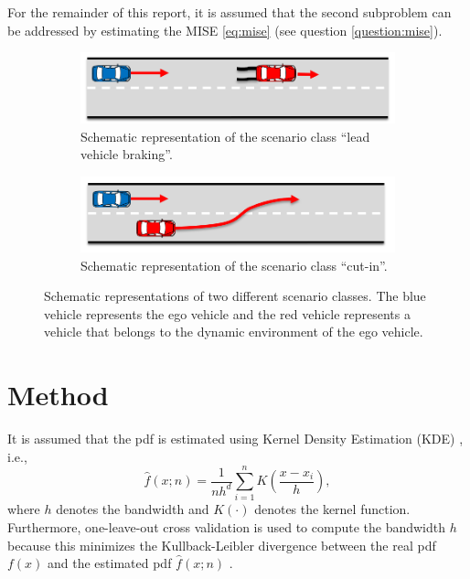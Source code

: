 \documentclass[10pt,final,a4paper,oneside,onecolumn]{article}
\theoremstyle{plain}\newtheorem{definition}{Definition}[section]    %
\theoremstyle{definition}\newtheorem{example}{Example}[section]     %
\theoremstyle{remark}\newtheorem{remarkenv}{Remark}[section]        %
\begin{document}
For the remainder of this report, it is assumed that the second subproblem can be addressed by estimating the MISE \cref{eq:mise} (see question \ref{question:mise}).

\begin{figure}
	\begin{subfigure}{\linewidth}
		\centering
		\includegraphics[scale=0.5]{"Scenario lead braking"}
		\caption{Schematic representation of the scenario class ``lead vehicle braking''.}
		\label{fig:lead vehicle braking}
	\end{subfigure}
	\begin{subfigure}{\linewidth}
		\centering
		\includegraphics[scale=0.5]{"Scenario cut-in"}
		\caption{Schematic representation of the scenario class ``cut-in''.}
		\label{fig:cut-in}
	\end{subfigure}
	\caption{Schematic representations of two different scenario classes. The blue vehicle represents the ego vehicle and the red vehicle represents a vehicle that belongs to the dynamic environment of the ego vehicle.}
	\label{fig:scenario classes}
\end{figure}



\section{Method}
\label{sec:method}

It is assumed that the pdf is estimated using Kernel Density Estimation (KDE) \cite{rosenblatt1956remarks, parzen1962estimation}, i.e.,
\begin{equation}
	\hat{f}(x;n) = \frac{1}{nh^d} \sum_{i=1}^n K \left( \frac{x - x_i}{h} \right),
\end{equation}
where $h$ denotes the bandwidth and $K(\cdot)$ denotes the kernel function. Furthermore, one-leave-out cross validation is used to compute the bandwidth $h$ because this minimizes the Kullback-Leibler divergence between the real pdf $f(x)$ and the estimated pdf $\hat{f}(x;n)$ \cite{turlach1993bandwidthselection}.
\end{document}
